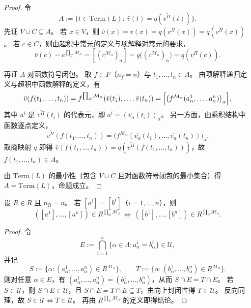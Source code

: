\documentclass[lang=cn,a4paper,newtx,section]{elegantbook}
\begin{document}
\begin{proof}
令
\[
  A:=\{t\in\mathrm{Term}(L):\ \bar v(t)=q(\overline{v^{\Pi}}(t))\}.
\]
先证 $V\cup C\subseteq A$。
若 $x\in V$，则 $\bar v(x)=v(x)=q(v^{\Pi}(x))=q(\overline{v^{\Pi}}(x))$。
若 $c\in C$，则由超积中常元的定义与项解释对常元的要求，
\[
  \bar v(c)=c^{\prod_{\mathcal U}\mathcal M_{\alpha}}=[(c^{\mathcal M_{\alpha}})_{\alpha}]=q\bigl((c^{\mathcal M_{\alpha}})_{\alpha}\bigr)=q(\overline{v^{\Pi}}(c)).
\]

再证 $A$ 对函数符号闭包。
取 $f\in F$（$n_f=n$）与 $t_1,\dots,t_n\in A$。
由项解释递归定义与超积中函数解释的定义，有
\[
  \bar v(f(t_1,\dots,t_n))=f^{\prod_{\mathcal U}\mathcal M_{\alpha}}(\bar v(t_1),\dots,\bar v(t_n))
  =\Bigl[\bigl(f^{\mathcal M_{\alpha}}(a^{1}_{\alpha},\dots,a^{n}_{\alpha})\bigr)_{\alpha}\Bigr],
\]
其中 $a^{i}$ 是 $\overline{v^{\Pi}}(t_i)$ 的代表元，即 $a^{i}=(\overline{v_{\alpha}}(t_i))_{\alpha}$。
另一方面，由乘积结构中函数逐点定义，
\[
  \overline{v^{\Pi}}(f(t_1,\dots,t_n))=\bigl(f^{\mathcal M_{\alpha}}(\overline{v_{\alpha}}(t_1),\dots,\overline{v_{\alpha}}(t_n))\bigr)_{\alpha}.
\]
取商映射 $q$ 即得 $\bar v(f(t_1,\dots,t_n))=q(\overline{v^{\Pi}}(f(t_1,\dots,t_n)))$，故 $f(t_1,\dots,t_n)\in A$。

由 $\mathrm{Term}(L)$ 的最小性（包含 $V\cup C$ 且对函数符号闭包的最小集合）得 $A=\mathrm{Term}(L)$，命题成立。
\end{proof}

\begin{proposition}[关系符号的良定义（重述）]
\label{ultraproduct-relation-well-defined}
设 $R\in R$ 且 $n_R=n$。
若 $[a^{i}]=[b^{i}]$（$i=1,\dots,n$），则
\[
  ([a^{1}],\dots,[a^{n}])\in R^{\prod_{\mathcal U}\mathcal M_{\alpha}}\ \Longleftrightarrow\ ([b^{1}],\dots,[b^{n}])\in R^{\prod_{\mathcal U}\mathcal M_{\alpha}}.
\]
\end{proposition}

\begin{proof}
令
\[
  E:=\bigcap_{i=1}^{n}\{\alpha\in\Lambda: a^{i}_{\alpha}=b^{i}_{\alpha}\}\in\mathcal U,
\]
并记
\[
  S:=\{\alpha:(a^{1}_{\alpha},\dots,a^{n}_{\alpha})\in R^{\mathcal M_{\alpha}}\},\qquad T:=\{\alpha:(b^{1}_{\alpha},\dots,b^{n}_{\alpha})\in R^{\mathcal M_{\alpha}}\}.
\]
则对任意 $\alpha\in E$，有 $(a^{1}_{\alpha},\dots,a^{n}_{\alpha})=(b^{1}_{\alpha},\dots,b^{n}_{\alpha})$，从而 $S\cap E=T\cap E$。
若 $S\in\mathcal U$，则 $S\cap E\in\mathcal U$，且 $S\cap E=T\cap E\subseteq T$，由向上封闭性得 $T\in\mathcal U$。
反向同理，故 $S\in\mathcal U\Longleftrightarrow T\in\mathcal U$。
再由 $R^{\prod_{\mathcal U}\mathcal M_{\alpha}}$ 的定义即得结论。
\end{proof}
\end{document}
